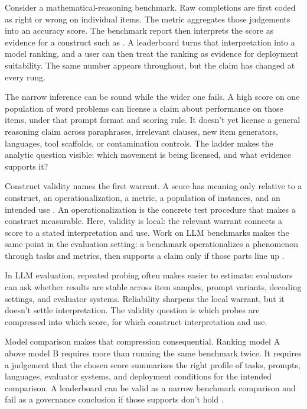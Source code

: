 \documentclass[12pt]{article}
\begin{document}
Consider a mathematical-reasoning benchmark. Raw completions are first coded as
right or wrong on individual items. The metric aggregates those judgements into
an accuracy score. The benchmark report then interprets the score as evidence
for a construct such as . A leaderboard turns that
interpretation into a model ranking, and a user can then treat the ranking as
evidence for deployment suitability. The same number appears throughout, but the
claim has changed at every rung.

The narrow inference can be sound while the wider one fails. A high score on one
population of word problems can license a claim about performance on those
items, under that prompt format and scoring rule. It doesn't yet license a
general reasoning claim across paraphrases, irrelevant clauses, new item
generators, languages, tool scaffolds, or contamination controls. The ladder
makes the analytic question visible: which movement is being licensed,
and what evidence supports it?

Construct validity names the first warrant. A score has meaning only relative to
a construct, an operationalization, a metric, a population of instances, and an
intended use \citep{kane2013validating,chouldechova2024shared}. An
operationalization is the concrete test procedure that makes a construct
measurable. Here, validity is local: the relevant warrant connects a score to a
stated interpretation and use. Work on LLM benchmarks makes the same point in
the evaluation setting: a benchmark operationalizes a phenomenon through tasks
and metrics, then supports a claim only if those parts line up
\citep{bean2025measuring,freiesleben2026establishing}.

In LLM evaluation, repeated probing often makes  easier to
estimate: evaluators can ask whether results are stable across item samples,
prompt variants, decoding settings, and evaluator systems. Reliability sharpens
the local warrant, but it doesn't settle interpretation. The validity question is
which probes are compressed into which score, for which construct interpretation
and use.

Model comparison makes that compression consequential. Ranking model A above
model B requires more than running the same benchmark twice. It requires a
judgement that the chosen score summarizes the right profile of tasks, prompts,
languages, evaluator systems, and deployment conditions for the intended
comparison. A leaderboard can be valid as a narrow benchmark comparison and fail
as a governance conclusion if those supports don't hold \citep{raji2021whole}.
\end{document}
